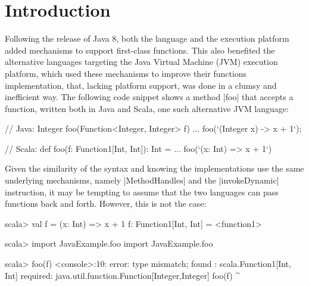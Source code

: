 



\section{Introduction}

Following the release of Java 8, both the language and the execution platform added mechanisms to support first-class functions. This also benefited the alternative languages targeting the Java Virtual Machine (JVM) execution platform, which used these mechanisms to improve their functions implementation, that, lacking platform support, was done in a clumsy and inefficient way. The following code snippet shows a method |foo| that accepts a function, written both in Java and Scala, one such alternative JVM language:

\begin{lstlisting-nobreak}
// Java:
Integer foo(Function<Integer, Integer> f) { ... }
foo(`(Integer x) -> x + 1`);
\end{lstlisting-nobreak}

\begin{lstlisting-nobreak}
// Scala:
def foo(f: Function1[Int, Int]): Int = { ... }
foo(`(x: Int) => x + 1`)
\end{lstlisting-nobreak}

Given the similarity of the syntax and knowing the implementations use the same underlying mechanisms, namely |MethodHandles| and the |invokeDynamic| instruction, it may be tempting to assume that the two languages can pass functions back and forth. However, this is not the case:

\begin{lstlisting-nobreak}
scala> val f = (x: Int) => x + 1
f: Function1[Int, Int] = <function1>

scala> import JavaExample.foo
import JavaExample.foo

scala> foo(f)
<console>:10: error: type mismatch;
 found   : scala.Function1[Int, Int]
 required: java.util.function.Function[Integer,Integer]
              foo(f)
                  ^
\end{lstlisting-nobreak}

